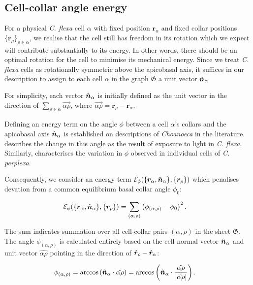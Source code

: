 \subsection{Cell-collar angle energy}
For a physical \textit{C. flexa} cell $\alpha$ with fixed position $\bm{r}_\alpha$ and fixed collar positions $\{\bm{r}_\rho\}_{\rho\in\alpha}$, we realise that the cell still has freedom in its rotation which we expect will contribute substantially to its energy. 
In other words, there should be an optimal rotation for the cell to minimise its mechanical energy. 
Since we treat \textit{C. flexa} cells as rotationally symmetric above the apicobasal axis, it suffices in our description to assign to each cell $\alpha$ in the graph $\mathfrak{G}$ a unit vector $\hat{\bm{n}}_\alpha$ 

For simplicity, each vector $\hat{\bm{n}}_\alpha$ is initially defined as the unit vector in the direction of $\sum_{\rho\in\alpha} \vec{\alpha\rho}$, where $\vec{\alpha\rho} = \bm{r}_\rho - \bm{r}_\alpha$.

Defining an energy term on the angle $\phi$ between a cell $\alpha$'s collars and the apicobasal axis $\hat{\bm{n}}_\alpha$ is established on descriptions of \textit{Choanoeca} in the literature. 
\citet{brunet2019} describes the change in this angle as the result of exposure to light in \textit{C. flexa}.
Similarly, \citet{ellis1930} characterises the variation in $\phi$ observed in individual cells of \textit{C. perplexa}.

Consequently, we consider an energy term $\mathcal{E}_\phi(\{\bm{r}_\alpha, \hat{\bm{n}}_\alpha\}, \{\bm{r}_\rho\})$ which penalises devation from a common equilibrium basal collar angle $\phi_0$:

\begin{align}
	\mathcal{E}_\phi(\{\bm{r}_\alpha, \hat{\bm{n}}_\alpha\}, \{\bm{r}_\rho\}) &= \sum_{(\alpha, \rho)} \left(\phi_{(\alpha, \rho)} - \phi_0 \right)^2. \label{eq:e_phi}
\end{align}

The sum indicates summation over all cell-collar pairs $(\alpha, \rho)$ in the sheet $\mathfrak{G}$. The angle $\phi_{(\alpha, \rho)}$ is calculated entirely based on the cell normal vector $\hat{\bm{n}}_\alpha$ and unit vector $\hat{\alpha\rho}$ pointing in the direction of $\hat{\bm{r}}_\rho - \hat{\bm{r}}_\alpha$:

\begin{align*}
	\phi_{(\alpha, \rho)} &= \arccos \left(\hat{\bm{n}}_\alpha \cdot \hat{\alpha\rho} \right) = \arccos \left(\hat{\bm{n}}_\alpha \cdot \frac{\hat{\alpha\rho}}{\left| \hat{\alpha\rho}\right|} \right). \label{eq:phi}
\end{align*}

